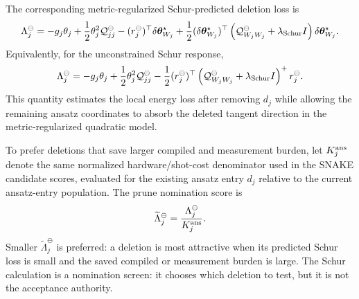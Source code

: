\documentclass[
  reprint,
  amsmath,
  amssymb,
  aps,
  pra,
  nofootinbib,
  superscriptaddress,
  floatfix
]{revtex4-2}
\begin{document}
The corresponding metric-regularized Schur-predicted deletion loss is
\begin{equation}
\Lambda_{j}^{\ominus}
=
-g_j\theta_j
+\frac12
\theta_j^2
\mathcal Q^\ominus_{jj}
-
(r_j^\ominus)^{\top}
\delta\boldsymbol\theta_{W_j}^{\star}
+
\frac12
(\delta\boldsymbol\theta_{W_j}^{\star})^{\top}
\left(
\mathcal Q^\ominus_{W_jW_j}
+\lambda_{\rm Schur} I
\right)
\delta\boldsymbol\theta_{W_j}^{\star}.
\label{eq:ablation_schur_loss}
\end{equation}
Equivalently, for the unconstrained Schur response,
\[
\Lambda_{j}^{\ominus}
=
-g_j\theta_j
+\frac12\theta_j^2
\mathcal Q^\ominus_{jj}
-
\frac12
(r_j^\ominus)^{\top}
\left(
\mathcal Q^\ominus_{W_jW_j}
+\lambda_{\rm Schur} I
\right)^+
r_j^\ominus .
\]
This quantity estimates the local energy loss after removing \(d_j\) while
allowing the remaining ansatz coordinates to absorb the deleted tangent
direction in the metric-regularized quadratic model.

To prefer deletions that save larger compiled and measurement burden, let
\(K_j^{\rm ans}\) denote the same normalized hardware/shot-cost denominator used
in the SNAKE candidate scores, evaluated for the existing ansatz entry \(d_j\)
relative to the current ansatz-entry population.  The prune nomination score is
\[
\widetilde\Lambda_j^\ominus
=
\frac{\Lambda_j^\ominus}{K_j^{\rm ans}} .
\]
Smaller \(\widetilde\Lambda_j^\ominus\) is preferred: a deletion is most
attractive when its predicted Schur loss is small and the saved compiled or
measurement burden is large.  The Schur calculation is a nomination screen: it
chooses which deletion to test, but it is not the acceptance authority.
\end{document}
